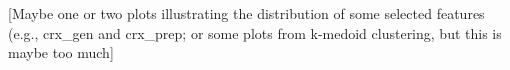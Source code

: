  




[Maybe one or two plots illustrating the distribution of some selected features (e.g., crx_gen and crx_prep; or some plots from k-medoid clustering, but this is maybe too much]
